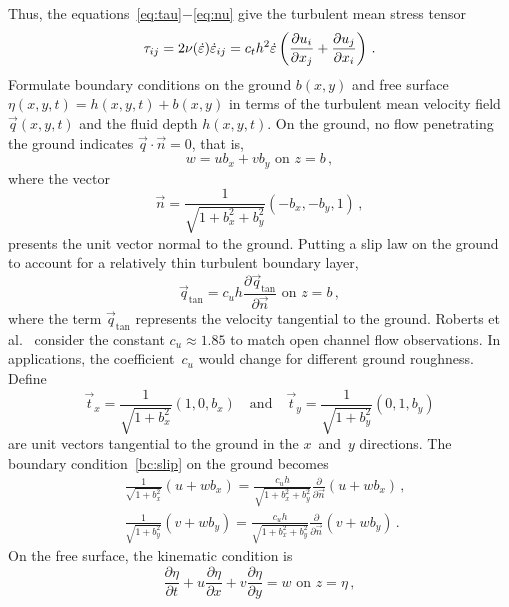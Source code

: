 \documentclass[a5paper,12pt]{article}
\newcommand{\ros}{{\dot\varepsilon}}
\begin{document}
Thus, the equations~\eqref{eq:tau}$-$\eqref{eq:nu} give the turbulent mean stress tensor
\begin{equation}
\tau_{ij}=2\nu(\ros)\ros_{ij}=c_th^2\ros\left( \D{x_j}{u_i} +\D{x_i}{u_j}\right) \,.\label{eq:stress}
\end{equation}
Formulate boundary conditions on the ground $b(x,y)$ and free surface $\eta(x,y,t)=h(x,y,t)+b(x,y)$ in terms of the turbulent mean velocity field $\vec q(x,y,t)$ and the fluid depth $h(x,y,t)$. 
On the ground, no flow penetrating the ground indicates $\vec q\cdot\vec n=0$, that is,
\begin{equation}
w=ub_x+vb_y \text{ on } z=b\,,
\label{eq:nopen}
\end{equation}
where the vector
\begin{equation}
\vec n=\frac{1}{\sqrt{1+b_x^2+b_y^2}}(-b_x,-b_y,1)\,,\label{eq:vecn}
\end{equation} 
presents the unit vector normal to the ground.  
Putting a slip law on the ground to account for a relatively thin turbulent boundary layer, 
\begin{equation}
\vec q_{\text{tan}}=c_uh\frac{\partial\vec q_{\text{tan}}}{\partial\vec n} \text{ on } z=b\,,
\label{bc:slip}
\end{equation} 
where the term $\vec q_{\text{tan}}$ represents the velocity tangential to the ground. 
Roberts et al.~\cite{Roberts2008} consider the constant $c_u\approx1.85$ to match open channel flow observations. 
In applications, the coefficient~$c_u$ would change for different ground roughness. 
Define
\begin{equation*}
\vec t_x=\frac{1}{\sqrt{1+b_x^2}}(1,0,b_x)
\quad\text{and}\quad
\vec t_y=\frac{1}{\sqrt{1+b_y^2}}(0,1,b_y)
\end{equation*}
are unit vectors tangential to the ground in the $x$~and~$y$ directions. 
The boundary condition~\eqref{bc:slip} on the ground becomes
\begin{align}&
\frac{1}{\sqrt{1+b_x^2}}(u+wb_x)=\frac{c_uh}{\sqrt{1+b_x^2+b_y^2}}\frac{\partial}{\partial\vec n}(u+wb_x)\,,\label{slip:u}\\&
\frac{1}{\sqrt{1+b_y^2}}(v+wb_y)=\frac{c_uh}{\sqrt{1+b_x^2+b_y^2}}\frac{\partial}{\partial\vec n}(v+wb_y)\,.\label{slip:v}
\end{align}
On the free surface, the kinematic condition is 
\begin{equation}
 \frac{\partial\eta}{\partial t}+u\frac{\partial\eta}{\partial x}+v\frac{\partial\eta}{\partial y}=w \text{ on } z=\eta\,,
\end{equation}
\end{document}
